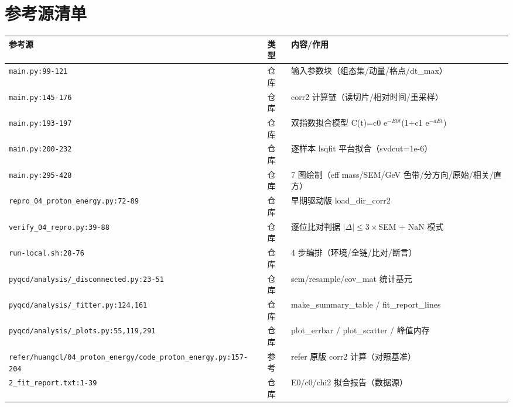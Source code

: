 \documentclass[UTF8]{ctexart}
\begin{document}
\section{参考源清单}
\begin{xltabular}{\textwidth}{XlX}
\toprule
\textcolor{evidence}{参考源} & 类型 & 内容/作用 \\
\midrule
\endhead
\texttt{\nolinkurl{main.py:99-121}} & 仓库 & 输入参数块（组态集/动量/格点/dt\_max） \\
\texttt{\nolinkurl{main.py:145-176}} & 仓库 & corr2 计算链（读切片/相对时间/重采样） \\
\texttt{\nolinkurl{main.py:193-197}} & 仓库 & 双指数拟合模型 C(t)=c0 e$^{-E0 t}$(1+c1 e$^{-dE t}$) \\
\texttt{\nolinkurl{main.py:200-232}} & 仓库 & 逐样本 lsqfit 平台拟合（svdcut=1e-6） \\
\texttt{\nolinkurl{main.py:295-428}} & 仓库 & 7 图绘制（eff mass/SEM/GeV 色带/分方向/原始/相关/直方） \\
\texttt{\nolinkurl{repro_04_proton_energy.py:72-89}} & 仓库 & 早期驱动版 load\_dir\_corr2 \\
\texttt{\nolinkurl{verify_04_repro.py:39-88}} & 仓库 & 逐位比对判据 $|\Delta|\le3\times$SEM + NaN 模式 \\
\texttt{\nolinkurl{run-local.sh:28-76}} & 仓库 & 4 步编排（环境/全链/比对/断言） \\
\texttt{\nolinkurl{pyqcd/analysis/_disconnected.py:23-51}} & 仓库 & sem/resample/cov\_mat 统计基元 \\
\texttt{\nolinkurl{pyqcd/analysis/_fitter.py:124,161}} & 仓库 & make\_summary\_table / fit\_report\_lines \\
\texttt{\nolinkurl{pyqcd/analysis/_plots.py:55,119,291}} & 仓库 & plot\_errbar / plot\_scatter / 峰值内存 \\
\texttt{\nolinkurl{refer/huangcl/04_proton_energy/code_proton_energy.py:157-204}} & 参考 & refer 原版 corr2 计算（对照基准） \\
\texttt{\nolinkurl{2_fit_report.txt:1-39}} & 仓库 & E0/c0/chi2 拟合报告（数据源） \\
\bottomrule
\end{xltabular}

\end{document}
